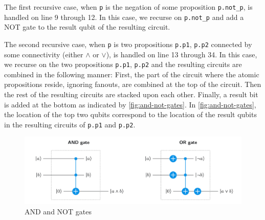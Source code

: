The first recursive case, when \texttt{p} is the negation of some proposition \texttt{p.not\_p}, is handled on line 9 through 12.
In this case, we recurse on \texttt{p.not\_p} and add a NOT gate to the result qubit of the resulting circuit.

The second recursive case, when \texttt{p} is two propositions \texttt{p.p1}, \texttt{p.p2} connected by some connectivity (either $\land$ or $\lor$), is handled on line 13 through 34.
In this case, we recurse on the two propositions \texttt{p.p1}, \texttt{p.p2} and the resulting circuits are combined in the following manner:
First, the part of the circuit where the atomic propositions reside, ignoring fanouts, are combined at the top of the circuit.
Then the rest of the resulting circuits are stacked upon each other.
Finally, a result bit is added at the bottom as indicated by \autoref{fig:and-not-gates}.
In \autoref{fig:and-not-gates}, the location of the top two qubits correspond to the location of the result qubits in the resulting circuits of \texttt{p.p1} and \texttt{p.p2}.

\begin{figure}[H]
    \centering
    \includegraphics[width=\textwidth]{figures/AND-and-OR-with-Toffoli.jpg}
    \caption{AND and NOT gates}
    \label{fig:and-not-gates}
\end{figure}

